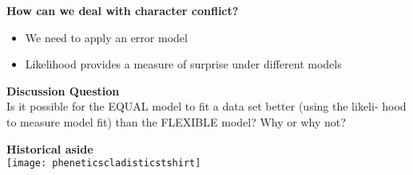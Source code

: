 \documentclass{beamer}
\begin{document}
\begin{frame}
\textbf{How can we deal with character conflict?}
\begin{itemize}
 \item We need to apply an error model
 \item Likelihood provides a measure of surprise under different models
\end{itemize}
\end{frame}










\begin{frame}
\textbf{Discussion Question}\\
Is it possible for the EQUAL model to fit a data set better (using the likeli-
hood to measure model fit) than the FLEXIBLE model? Why or why not?
\end{frame}



\begin{frame}
\textbf{Historical aside}\\
\texttt{[image: pheneticscladisticstshirt]}
\end{frame}


\end{document}
